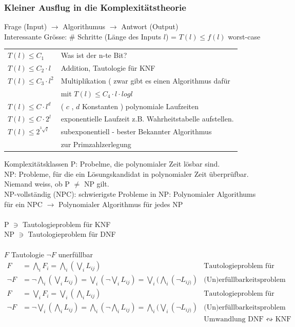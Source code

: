 \subsubsection{Kleiner Ausflug in die Komplexitätstheorie}
Frage (Input) $\rightarrow$ Algorithumus $\rightarrow$ Antwort (Output) \\
Interessante Grösse: \# Schritte (Länge des Inputs $l$) = $T( l ) \leq f( l )$ \quad worst-case \\
\begin{bsp*}
	\begin{tabular}{ l l }
		$T( l ) \leq C_1$			& Was ist der n-te Bit?														\\
		$T( l ) \leq C_2 \cdot l$	& Addition, Tautologie für KNF												\\
		$T( l ) \leq C_3 \cdot l^2$	& Multiplikation ( zwar gibt es einen Algorithmus dafür \\&mit $T( l ) \leq C_4 \cdot l \cdot log l$	\\
		$T( l ) \leq C \cdot l^d$	& ( $c$ , $d$ Konstanten ) polynomiale Laufzeiten										\\
		$T( l ) \leq C \cdot 2^l$	& exponentielle Laufzeit z.B. Wahrheitstabelle aufstellen.								\\
		$T( l ) \leq 2^{^3\sqrt{l}}$	& subexponentiell - bester Bekannter Algorithmus \\&zur Primzahlzerlegung					
	\end{tabular}
\end{bsp*}
Komplexitätsklassen
P: Probelme, die polynomialer Zeit lösbar sind. \\
NP: Probleme, für die ein Lösungskandidat in polynomialer Zeit überprüfbar. \\
Niemand weiss, ob P $\neq$ NP gilt. \\ 
NP-vollständig (NPC): schwierigste Probleme in NP: Polynomialer Algorithums für ein NPC $\rightarrow$ Polynomialer Algorithmus für jedes NP \\
\\
P $\ni$ Tautologieproblem für KNF \\
NP $\ni$ Tautologieproblem für DNF \\
\\
$F$ Tautologie \gdw $\neg F$ unerfüllbar \\
\begin{align*}
	F		& = \bigwedge_i F_i = \bigwedge_i ( \bigvee_i L_{ij} )	& \text{Tautologieproblem für KNF =} \\
	\neg F	& = \neg \bigwedge_i ( \bigvee_i L_{ij} ) = \bigvee_i ( \neg \bigvee_i L_{ij} ) = \bigvee_i ( \bigwedge_i  ( \neg L_{ij ) } ) & \text{(Un)erfüllbarkeitsproblem für DNF}\\
	F		& = \bigvee_i F_i = \bigvee_i ( \bigwedge_i L_{ij} )		& \text{Tautologieproblem für DNF =} \\
	\neg F	& = \neg \bigvee_i ( \bigwedge_i L_{ij} ) = \bigwedge_i ( \neg \bigwedge_i L_{ij} ) = \bigwedge_i ( \bigvee_i  ( \neg L_{ij ) } ) & \text{(Un)erfüllbarkeitsproblem für KNF =} \\
	&& \text{Umwandlung DNF } \leftrightsquigarrow \text{ KNF} \\
\end{align*}
